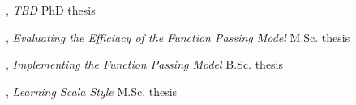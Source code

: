 \documentclass[9pt]{article}
\begin{document}
, {\em TBD} 
\newline\noindent PhD thesis 
\medskip


, {\em Evaluating the Efficiacy of the Function Passing Model} 
\newline\noindent M.Sc. thesis 
\medskip

, {\em Implementing the Function Passing Model} 
\newline\noindent B.Sc. thesis 
\medskip


, {\em Learning Scala Style} 
\newline\noindent M.Sc. thesis 
\medskip
\end{document}

